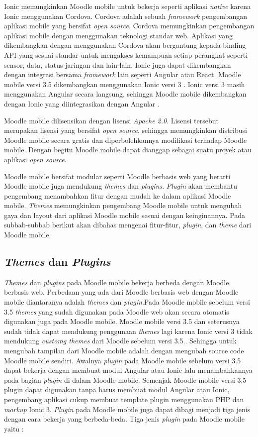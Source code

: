Ionic memungkinkan Moodle mobile untuk bekerja seperti aplikasi \textit{native} karena Ionic menggunakan Cordova. Cordova adalah sebuah \textit{framework} pengembangan aplikasi mobile yang bersifat \textit{open source}. Cordova memungkinkan pengembangan aplikasi mobile dengan menggunakan teknologi standar web. Aplikasi yang dikembangkan dengan menggunakan Cordova akan bergantung kepada binding API yang sesuai standar untuk mengakses kemampuan setiap perangkat seperti sensor, data, status jaringan dan lain-lain\cite{cordova:overview}. Ionic juga dapat dikembangkan dengan integrasi bersama \textit{framework} lain seperti Angular atau React. Moodle mobile versi 3.5 dikembangkan menggunakan Ionic versi 3 \cite{Moodlemobile:mm}. Ionic versi 3 masih menggunakan Angular secara langsung, sehingga Moodle mobile dikembangkan dengan Ionic yang diintegrasikan dengan Angular \cite{Moodlemobile:ionicangular}.

Moodle mobile dilisensikan dengan lisensi \textit{Apache 2.0}\cite{Moodlemobile:license}. Lisensi tersebut merupakan lisensi yang bersifat \textit{open source}, sehingga memungkinkan distribusi Moodle mobile secara gratis dan diperbolehkannya modifikasi terhadap Moodle mobile. Dengan begitu Moodle mobile dapat dianggap sebagai suatu proyek atau aplikasi \textit{open source}.

Moodle mobile bersifat modular seperti Moodle berbasis web yang berarti Moodle mobile juga mendukung \textit{themes} dan \textit{plugins}. \textit{Plugin} akan membantu pengembang menambahkan fitur dengan mudah ke dalam aplikasi Moodle mobile. \textit{Themes} memungkinkan pengembang Moodle mobile untuk mengubah gaya dan layout dari aplikasi Moodle mobile sesuai dengan keinginannya. Pada subbab-subbab berikut akan dibahas mengenai fitur-fitur, \textit{plugin}, dan \textit{theme} dari Moodle mobile.
\subsection{\textit{Themes} dan \textit{Plugins}}
\textit{Themes} dan \textit{plugins} pada Moodle mobile bekerja berbeda dengan Moodle berbasis web. Perbedaan yang ada dari Moodle berbasis web dengan Moodle mobile diantaranya adalah \textit{themes} dan \textit{plugin}.Pada Moodle mobile sebelum versi 3.5 \textit{themes} yang sudah digunakan pada Moodle web akan secara otomatis digunakan juga pada Moodle mobile. Moodle mobile versi 3.5 dan seterusnya sudah tidak dapat mendukung penggunaan \textit{themes} lagi karena Ionic versi 3 tidak mendukung \textit{customg themes} dari Moodle sebelum versi 3.5.\cite{Moodlemobile:themes}. Sehingga untuk mengubah tampilan dari Moodle mobile adalah dengan mengubah source code Moodle mobile sendiri. Awalnya \textit{plugin} pada Moodle mobile sebelum versi 3.5 dapat bekerja dengan membuat modul Angular atau Ionic lalu menambahkannya pada bagian \textit{plugin} di dalam Moodle mobile. Semenjak Moodle mobile versi 3.5 plugin dapat digunakan tanpa harus membuat modul Angular atau Ionic, pengembang aplikasi cukup membuat template plugin menggunakan PHP dan \textit{markup} Ionic 3\cite{Moodlemobile:plugin}. \textit{Plugin} pada Moodle mobile juga dapat dibagi menjadi tiga jenis dengan cara bekerja yang berbeda-beda. Tiga jenis \textit{plugin} pada Moodle mobile yaitu :


